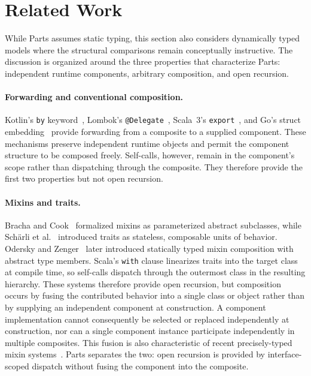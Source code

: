 \documentclass[acmsmall,nonacm]{acmart}
\theoremstyle{acmplain}
\newcommand{\code}[1]{\texttt{#1}}
\begin{document}
\section{Related Work}
\label{sec:related}

While Parts assumes static typing, this section also considers dynamically typed
models where the structural comparisons remain conceptually instructive. The
discussion is organized around the three properties that characterize Parts:
independent runtime components, arbitrary composition, and open recursion.

\paragraph{Forwarding and conventional composition.}
Kotlin's \code{by} keyword~\cite{kotlin}, Lombok's \code{@Delegate}~\cite{lombok},
Scala~3's \code{export}~\cite{scala3export}, and Go's struct
embedding~\cite{go} provide forwarding from a composite to a supplied component.
These mechanisms preserve independent runtime objects and permit the component
structure to be composed freely. Self-calls, however, remain in the component's
scope rather than dispatching through the composite. They therefore provide the
first two properties but not open recursion.

\paragraph{Mixins and traits.}
Bracha and Cook~\cite{bracha1990} formalized mixins as parameterized abstract
subclasses, while Sch\"arli et al.~\cite{scharli2003} introduced traits as
stateless, composable units of behavior. Odersky and Zenger~\cite{odersky2005}
later introduced statically typed mixin composition with abstract type members.
Scala's \code{with} clause linearizes traits into the target class at compile
time, so self-calls dispatch through the outermost class in the resulting
hierarchy. These systems therefore provide open recursion, but composition
occurs by fusing the contributed behavior into a single class or object rather
than by supplying an independent component at construction. A component
implementation cannot consequently be selected or replaced independently at
construction, nor can a single component instance participate independently in
multiple composites. This fusion is also characteristic of recent
precisely-typed mixin systems~\cite{fanparreaux2023}. Parts separates the two:
open recursion is provided by interface-scoped dispatch without fusing the
component into the composite.
\end{document}
